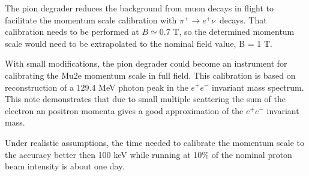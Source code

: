 \documentclass[12pt]{article}
\newcommand {\piplusenu} {\mbox{$\pi^+ \to e^+ \nu$}}
\begin{document}
The pion degrader reduces the background from muon decays in flight to facilitate
the momentum scale calibration with \piplusenu\ decays. That calibration needs to
be performed at $B \simeq 0.7$ T, so the determined momentum scale would need to be
extrapolated to the nominal field value, B = 1 T.

With small modifications, the pion degrader could become an instrument
for calibrating the Mu2e momentum scale in full field. This calibration is based on
reconstruction of a 129.4 MeV photon peak in the $e^+e^-$ invariant mass spectrum.
%
This note demonstrates that due to small multiple scattering the sum of the
electron an positron momenta gives a good approximation of the $e^+e^-$ invariant mass.

Under realistic assumptions, the time needed to calibrate the momentum scale
to the accuracy better then 100 keV while running at 10\% of the nominal proton beam
intensity is about one day.


%
\newpage



% 

\end{document}
